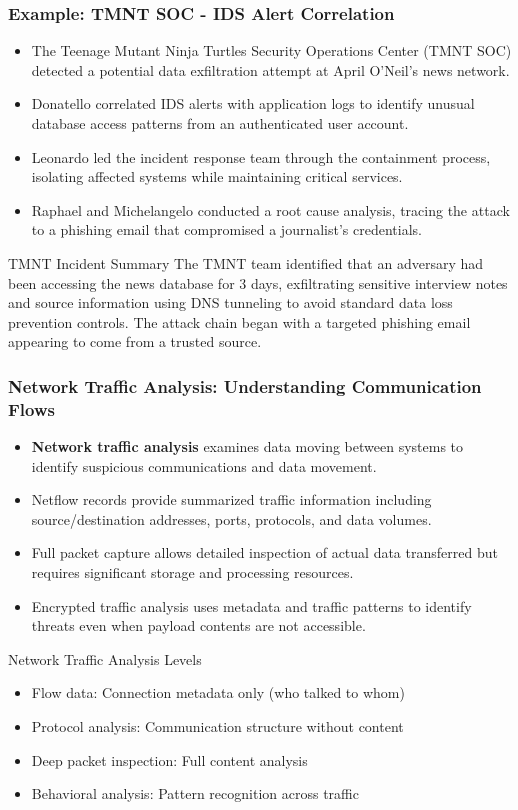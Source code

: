 \documentclass{beamer}
\begin{document}
\begin{frame}
\frametitle{Example: TMNT SOC - IDS Alert Correlation}
\begin{itemize}
\item The Teenage Mutant Ninja Turtles Security Operations Center (TMNT SOC) detected a potential data exfiltration attempt at April O'Neil's news network.
\item Donatello correlated IDS alerts with application logs to identify unusual database access patterns from an authenticated user account.
\item Leonardo led the incident response team through the containment process, isolating affected systems while maintaining critical services.
\item Raphael and Michelangelo conducted a root cause analysis, tracing the attack to a phishing email that compromised a journalist's credentials.
\end{itemize}

\begin{alertblock}{TMNT Incident Summary}
The TMNT team identified that an adversary had been accessing the news database for 3 days, exfiltrating sensitive interview notes and source information using DNS tunneling to avoid standard data loss prevention controls. The attack chain began with a targeted phishing email appearing to come from a trusted source.
\end{alertblock}
\end{frame}

\begin{frame}
\frametitle{Network Traffic Analysis: Understanding Communication Flows}
\begin{itemize}
\item \textbf{Network traffic analysis} examines data moving between systems to identify suspicious communications and data movement.
\item Netflow records provide summarized traffic information including source/destination addresses, ports, protocols, and data volumes.
\item Full packet capture allows detailed inspection of actual data transferred but requires significant storage and processing resources.
\item Encrypted traffic analysis uses metadata and traffic patterns to identify threats even when payload contents are not accessible.
\end{itemize}

\begin{block}{Network Traffic Analysis Levels}
\scriptsize
\begin{itemize}
\item Flow data: Connection metadata only (who talked to whom)
\item Protocol analysis: Communication structure without content
\item Deep packet inspection: Full content analysis
\item Behavioral analysis: Pattern recognition across traffic
\end{itemize}
\end{block}
\end{frame}
\end{document}
